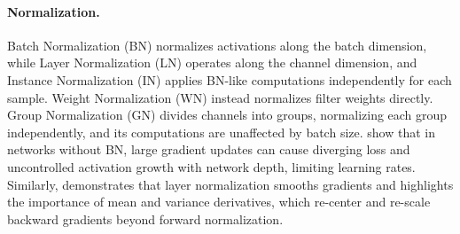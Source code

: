 \paragraph{Normalization.} Batch Normalization (BN) \cite{ioffe2015batch} normalizes activations along the batch dimension, while Layer Normalization (LN) \cite{ba2016layer} operates along the channel dimension, and Instance Normalization (IN) \cite{huang2017arbitrary} applies BN-like computations independently for each sample. Weight Normalization (WN) \cite{salimans2016weight} instead normalizes filter weights directly. Group Normalization (GN) divides channels into groups, normalizing each group independently, and its computations are unaffected by batch size. \citet{bjorck2018understanding} show that in networks without BN, large gradient updates can cause diverging loss and uncontrolled activation growth with network depth, limiting learning rates. Similarly, \citet{xu2019understanding} demonstrates that layer normalization smooths gradients and highlights the importance of mean and variance derivatives, which re-center and re-scale backward gradients beyond forward normalization.